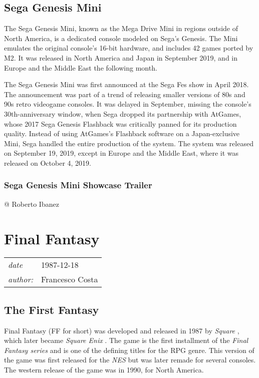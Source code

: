 \documentclass[a4paper,10pt]{book}
\newcommand{\pageHeader}[4]{
    \section{#1}
    \vspace{-0.3cm}
    \begin{table}[h!]
     \begin{tabular}{ll}
        \hline
        \textit{date} & #2 \\
        \textit{author: } & #3\\
        \hline
     \end{tabular}
    \end{table}
    \vspace{-0.3cm}
}
\begin{document}
 \subsection{Sega Genesis Mini  }
 
            The Sega Genesis Mini, known as the Mega Drive Mini in regions outside of North America, is a dedicated console modeled on Sega's Genesis. 
            The Mini emulates the original console's 16-bit hardware, and includes 42 games ported by M2. 
            It was released in North America and Japan in September 2019, and in Europe and the Middle East the following month.
         
 
            The Sega Genesis Mini was first announced at the Sega Fes show in April 2018. 
            The announcement was part of a trend of releasing smaller versions of 80s and 90s retro videogame consoles. 
            It was delayed in September, missing the console's 30th-anniversary window, when Sega dropped its partnership with AtGames, whose 2017 Sega Genesis Flashback was critically panned for its production quality. 
            Instead of using AtGames's Flashback software on a Japan-exclusive Mini, Sega handled the entire production of the system. 
            The system was released on September 19, 2019, except in Europe and the Middle East, where it was released on October 4, 2019.
         
 \subsubsection{Sega Genesis Mini Showcase Trailer  }
 
 
 
 @ Roberto Ibanez 
 
 \newpage\pageHeader{Final Fantasy}{1987-12-18}{Francesco Costa}{The first installment of the Final Fantasy series}
 \subsection{The First Fantasy }
 
          Final Fantasy (FF for short) was developed and released in 1987 by
           \textit{Square }, which later became  \textit{Square Enix }. The game is the
          first installment of the  \textit{Final Fantasy series } and is one of the
          defining titles for the RPG genre. This version of the game was first
          released for the  \textit{NES } but was later remade for several consoles.
          The western release of the game was in 1990, for North America.
         
\end{document}

